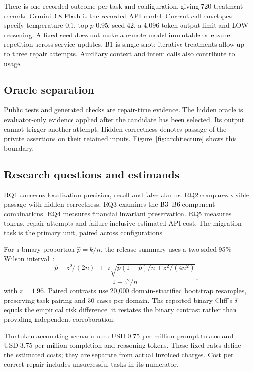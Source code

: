 There is one recorded outcome per task and configuration, giving 720 treatment records. Gemini 3.8 Flash is the recorded API model. Current call envelopes specify temperature 0.1, top-$p$ 0.95, seed 42, a 4,096-token output limit and LOW reasoning. A fixed seed does not make a remote model immutable or ensure repetition across service updates. B1 is single-shot; iterative treatments allow up to three repair attempts. Auxiliary context and intent calls also contribute to usage.

\subsection{Oracle separation}
Public tests and generated checks are repair-time evidence. The hidden oracle is evaluator-only evidence applied after the candidate has been selected. Its output cannot trigger another attempt. Hidden correctness denotes passage of the private assertions on their retained inputs. Figure~\ref{fig:architecture} shows this boundary.

\subsection{Research questions and estimands}
RQ1 concerns localization precision, recall and false alarms. RQ2 compares visible passage with hidden correctness. RQ3 examines the B3--B6 component combinations. RQ4 measures financial invariant preservation. RQ5 measures tokens, repair attempts and failure-inclusive estimated API cost. The migration task is the primary unit, paired across configurations.

For a binary proportion $\hat p=k/n$, the release summary uses a two-sided 95\% Wilson interval~\cite{wilson1927}:
\begin{equation}
\frac{\hat p+z^2/(2n)\;\pm\;z\sqrt{\hat p(1-\hat p)/n+z^2/(4n^2)}}{1+z^2/n},
\label{eq:wilson}
\end{equation}
with $z=1.96$. Paired contrasts use 20,000 domain-stratified bootstrap resamples, preserving task pairing and 30 cases per domain. The reported binary Cliff's $\delta$ equals the empirical risk difference; it restates the binary contrast rather than providing independent corroboration.

The token-accounting scenario uses USD 0.75 per million prompt tokens and USD 3.75 per million completion and reasoning tokens. These fixed rates define the estimated costs; they are separate from actual invoiced charges. Cost per correct repair includes unsuccessful tasks in its numerator.

